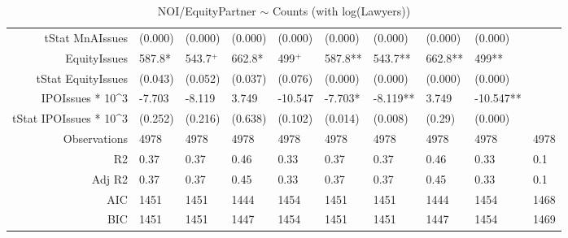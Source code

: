 \begin{table}[ht]
\begin{tabular}{rlllllllll}
  tStat MnAIssues & (0.000) & (0.000) & (0.000) & (0.000) & (0.000) & (0.000) & (0.000) & (0.000) &  \\ 
  EquityIssues & 587.8* & 543.7$^{+}$ & 662.8* & 499$^{+}$ & 587.8** & 543.7** & 662.8** & 499** &  \\ 
  tStat EquityIssues & (0.043) & (0.052) & (0.037) & (0.076) & (0.000) & (0.000) & (0.000) & (0.000) &  \\ 
  IPOIssues * 10^3 & -7.703 & -8.119 & 3.749 & -10.547 & -7.703* & -8.119** & 3.749 & -10.547** &  \\ 
  tStat IPOIssues * 10^3 & (0.252) & (0.216) & (0.638) & (0.102) & (0.014) & (0.008) & (0.29) & (0.000) &  \\ 
  Observations & 4978 & 4978 & 4978 & 4978 & 4978 & 4978 & 4978 & 4978 & 4978 \\ 
  R2 & 0.37 & 0.37 & 0.46 & 0.33 & 0.37 & 0.37 & 0.46 & 0.33 & 0.1 \\ 
  Adj R2 & 0.37 & 0.37 & 0.45 & 0.33 & 0.37 & 0.37 & 0.45 & 0.33 & 0.1 \\ 
  AIC & 1451 & 1451 & 1444 & 1454 & 1451 & 1451 & 1444 & 1454 & 1468 \\ 
  BIC & 1451 & 1451 & 1447 & 1454 & 1451 & 1451 & 1447 & 1454 & 1469 \\ 
   \hline
\end{tabular}
\caption{NOI/EquityPartner $\sim$ Counts (with log(Lawyers))} 
\end{table}
